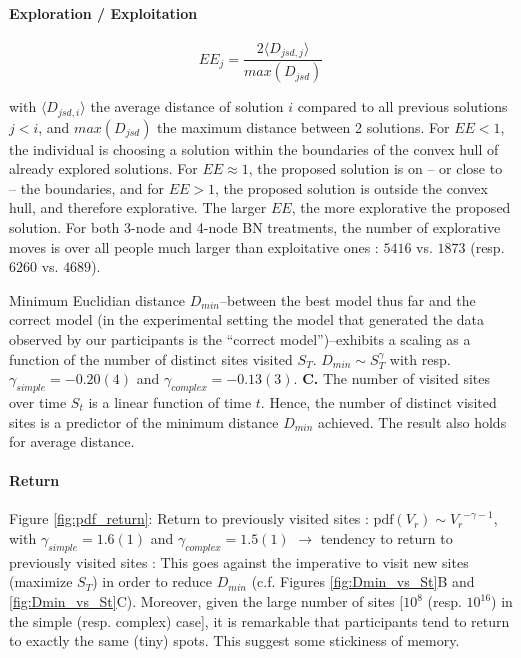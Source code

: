\paragraph{Exploration / Exploitation}


\begin{equation}
EE_{j} = \frac{2 \langle D_{jsd,j} \rangle}{max(D_{jsd})}  
\end{equation}

with $\langle D_{jsd,i} \rangle$ the average distance of solution $i$ compared to all previous solutions $j < i$, and $ max(D_{jsd})$ the maximum distance between 2 solutions. For $EE < 1$, the individual is choosing a solution within the boundaries of the convex hull of already explored solutions. For $EE \approx 1$, the proposed solution is on -- or close to -- the boundaries, and for $EE > 1$, the proposed solution is outside the convex hull, and therefore explorative. The larger $EE$, the more explorative the proposed solution. For both 3-node and 4-node BN treatments,  the number of explorative moves is over all people much larger than exploitative ones :  $5416$ vs. $1873$ (resp. $6260$ vs. $4689$). 

Minimum Euclidian distance $D_{min}$--between the best model thus far and the correct model (in the experimental setting the model that generated the data observed by our participants is the ``correct model'')--exhibits a scaling as a function of the number of distinct sites visited $S_{T}$. $D_{min} \sim S_{T}^{\gamma}$ with resp. $\gamma_{simple} = -0.20(4)$ and $\gamma_{complex} = - 0.13(3)$. {\bf C.} The number of visited sites over time $S_t$ is a linear function of time $t$. Hence, the number of distinct visited sites is a predictor of the minimum distance $D_{min}$ achieved. The result also holds for average distance.

\paragraph{Return}
Figure \ref{fig:pdf_return}: Return to previously visited sites : $\mathrm{pdf}(V_r) \sim {V_r}^{- \gamma -1}$, with $\gamma_{simple} = 1.6(1)$ and $\gamma_{complex} = 1.5(1)$ $\rightarrow$ tendency to return to previously visited sites : This goes against the imperative to visit new sites (maximize $S_T$) in order to reduce $D_{min}$ (c.f. Figures \ref{fig:Dmin_vs_St}B and \ref{fig:Dmin_vs_St}C). Moreover, given the large number of sites [$10^{8}$ (resp. $10^{16}$) in the simple (resp. complex) case], it is remarkable that participants tend to return to exactly the same (tiny) spots. This suggest some stickiness of memory.


